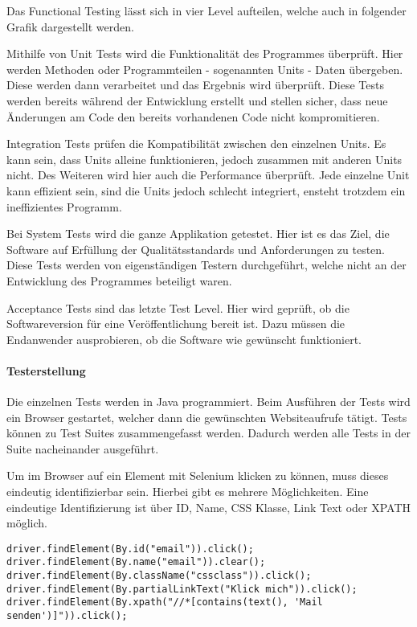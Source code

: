 Das Functional Testing lässt sich in vier Level aufteilen, welche auch in folgender Grafik dargestellt werden.


Mithilfe von Unit Tests wird die Funktionalität des Programmes überprüft. Hier werden Methoden oder Programmteilen - sogenannten Units - Daten übergeben. Diese werden dann verarbeitet und das Ergebnis wird überprüft. Diese Tests werden bereits während der Entwicklung erstellt und stellen sicher, dass neue Änderungen am Code den bereits vorhandenen Code nicht kompromitieren. \cite{TESTING3}

\newpage

Integration Tests prüfen die Kompatibilität zwischen den einzelnen Units. Es kann sein, dass Units alleine funktionieren, jedoch zusammen mit anderen Units nicht. Des Weiteren wird hier auch die Performance überprüft. Jede einzelne Unit kann effizient sein, sind die Units jedoch schlecht integriert, ensteht trotzdem ein ineffizientes Programm. \cite{TESTING3}

Bei System Tests wird die ganze Applikation getestet. Hier ist es das Ziel, die Software auf  Erfüllung der Qualitätsstandards und Anforderungen zu testen. Diese Tests werden von eigenständigen Testern durchgeführt, welche nicht an der Entwicklung des Programmes beteiligt waren. \cite{TESTING3}

Acceptance Tests sind das letzte Test Level. Hier wird geprüft, ob die Softwareversion für eine Veröffentlichung bereit ist. Dazu müssen die Endanwender ausprobieren, ob die Software wie gewünscht funktioniert. \cite{TESTING3}

\paragraph{Testerstellung}
Die einzelnen Tests werden in Java programmiert. Beim Ausführen der Tests wird ein Browser gestartet, welcher dann die gewünschten Websiteaufrufe tätigt. Tests können zu Test Suites zusammengefasst werden. Dadurch werden alle Tests in der Suite nacheinander ausgeführt. 

Um im Browser auf ein Element mit Selenium klicken zu können, muss dieses eindeutig identifizierbar sein. Hierbei gibt es mehrere Möglichkeiten. Eine eindeutige Identifizierung ist über ID, Name, CSS Klasse, Link Text oder XPATH möglich. 

\begin{lstlisting}[caption = Selenium Element Selektoren, label = testing1]
driver.findElement(By.id("email")).click();
driver.findElement(By.name("email")).clear();
driver.findElement(By.className("cssclass")).click();
driver.findElement(By.partialLinkText("Klick mich")).click();
driver.findElement(By.xpath("//*[contains(text(), 'Mail senden')]")).click();
\end{lstlisting}


